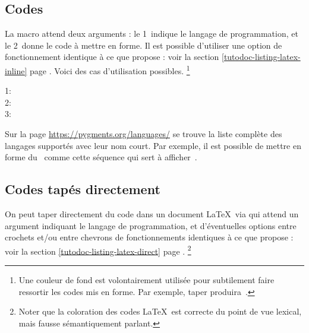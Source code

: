 \subsection{Codes }

La macro  attend deux arguments : le 1\ier\ indique le langage de programmation, et le 2\ieme\ donne le code à mettre en forme.
Il est possible d'utiliser une option de fonctionnement identique à ce que propose  : voir la section \ref{tutodoc-listing-latex-inline} page \pageref{tutodoc-listing-latex-inline}.
Voici des cas d'utilisation possibles.%
\footnote{
    Une couleur de fond est volontairement utilisée pour subtilement faire ressortir les codes mis en forme.
    Par exemple, taper  produira \,.
}

\begin{tdoclatex}
1:              \\
2:  \\
3: 
\end{tdoclatex}

\medskip

\begin{tdocnote}
	Sur la page \url{https://pygments.org/languages/} se trouve la liste complète des langages supportés avec leur nom court.
	Par exemple, il est possible de mettre en forme du \brainfuck\ comme cette séquence  qui sert à afficher \,.
\end{tdocnote}



\subsection{Codes tapés directement}

On peut taper directement du code dans un document \LaTeX\ via  qui attend un argument indiquant le langage de programmation, et d'éventuelles options entre crochets et/ou entre chevrons de fonctionnements identiques à ce que propose  : voir la section \ref{tutodoc-listing-latex-direct} page \pageref{tutodoc-listing-latex-direct}.%
\footnote{
	Noter que la coloration des codes \LaTeX\ est correcte du point de vue lexical, mais fausse sémantiquement parlant.
}


